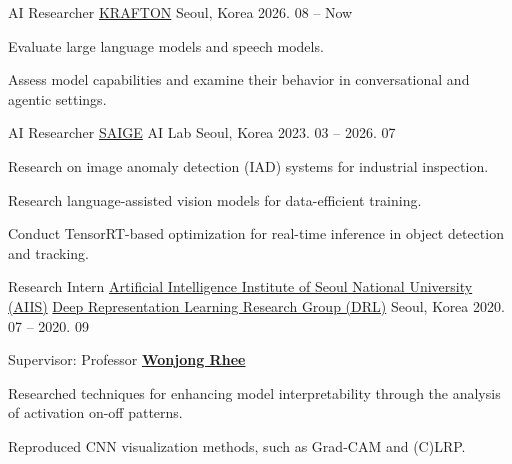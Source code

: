\documentclass[11pt, a4paper]{cv}
\begin{document}
\begin{cventries}
\vspace{-1mm}

  \cvexperience
    {AI Researcher} %
    {\href{https://www.krafton.com/}{KRAFTON}} %
    {} %
    {Seoul, Korea} %
    {2026. 08 -- Now} %
    {
      \begin{cvitems} %
        \item {Evaluate large language models and speech models.}
        \item {Assess model capabilities and examine their behavior in conversational and agentic settings.}
      \end{cvitems}
    }

  \cvexperience
    {AI Researcher} %
    {\href{https://saige.ai/en/}{SAIGE}} %
    {AI Lab} %
    {Seoul, Korea} %
    {2023. 03 -- 2026. 07} %
    {
      \begin{cvitems} %
        \item {Research on image anomaly detection (IAD) systems for industrial inspection.}
        \item {Research language-assisted vision models for data-efficient training.}
        \item {Conduct TensorRT-based optimization for real-time inference in object detection and tracking.}
      \end{cvitems}
    }

  \cvexperience
    {Research Intern} %
    {\href{https://aiis.snu.ac.kr/eng/}{Artificial Intelligence Institute of Seoul National University (AIIS)}} %
    {\href{http://drl.snu.ac.kr}{Deep Representation Learning Research Group (DRL)}} %
    {Seoul, Korea} %
    {2020. 07 -- 2020. 09} %
    {
      \begin{cvitems} %
        \item {Supervisor: Professor \href{http://drl.snu.ac.kr/?p=13209}{\bfseries\color{graytext} Wonjong Rhee}}
        \item {Researched techniques for enhancing model interpretability through the analysis of activation on-off patterns.}
        \item {Reproduced CNN visualization methods, such as Grad-CAM and (C)LRP.}
      \end{cvitems}
    }


\end{cventries}
\end{document}
